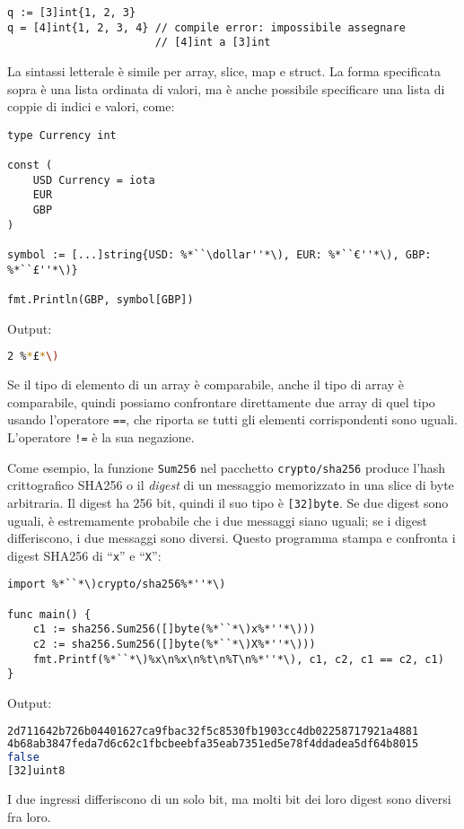 \begin{lstlisting}[frame=single, label={lst:lstlisting3-1.6}]
q := [3]int{1, 2, 3}
q = [4]int{1, 2, 3, 4} // compile error: impossibile assegnare
                       // [4]int a [3]int
\end{lstlisting}
La sintassi letterale è simile per array, slice, map e struct.
La forma specificata sopra è una lista ordinata di valori, ma è anche possibile specificare una lista di coppie di indici e valori, come:
\begin{lstlisting}[frame=single, label={lst:lstlisting3-1.7}]
type Currency int

const (
    USD Currency = iota
    EUR
    GBP
)

symbol := [...]string{USD: %*``\dollar''*\), EUR: %*``€''*\), GBP: %*``£''*\)}

fmt.Println(GBP, symbol[GBP])
\end{lstlisting}
Output:
\begin{lstlisting}[language=bash, frame=L, label={lst:lstlisting3-1.8}]
2 %*£*\)
\end{lstlisting}
Se il tipo di elemento di un array è comparabile, anche il tipo di array è comparabile, quindi possiamo confrontare direttamente due array di quel tipo usando l'operatore \verb|==|, che riporta se tutti gli elementi corrispondenti sono uguali.
L'operatore \verb|!=| è la sua negazione.

Come esempio, la funzione \verb|Sum256| nel pacchetto \verb|crypto/sha256| produce l'hash crittografico SHA256 o il \textit{digest} di un messaggio memorizzato in una slice di byte arbitraria.
Il digest ha 256 bit, quindi il suo tipo è \verb|[32]byte|.
Se due digest sono uguali, è estremamente probabile che i due messaggi siano uguali;
se i digest differiscono, i due messaggi sono diversi.
Questo programma stampa e confronta i digest SHA256 di ``\verb|x|'' e ``\verb|X|'':
\begin{lstlisting}[frame=single, label={lst:lstlisting3-1.9}]
import %*``*\)crypto/sha256%*''*\)

func main() {
    c1 := sha256.Sum256([]byte(%*``*\)x%*''*\)))
    c2 := sha256.Sum256([]byte(%*``*\)X%*''*\)))
    fmt.Printf(%*``*\)%x\n%x\n%t\n%T\n%*''*\), c1, c2, c1 == c2, c1)
}
\end{lstlisting}
Output:
\begin{lstlisting}[language=bash, frame=L, label={lst:lstlisting3-1.10}]
2d711642b726b04401627ca9fbac32f5c8530fb1903cc4db02258717921a4881
4b68ab3847feda7d6c62c1fbcbeebfa35eab7351ed5e78f4ddadea5df64b8015
false
[32]uint8
\end{lstlisting}
I due ingressi differiscono di un solo bit, ma molti bit dei loro digest sono diversi fra loro.

